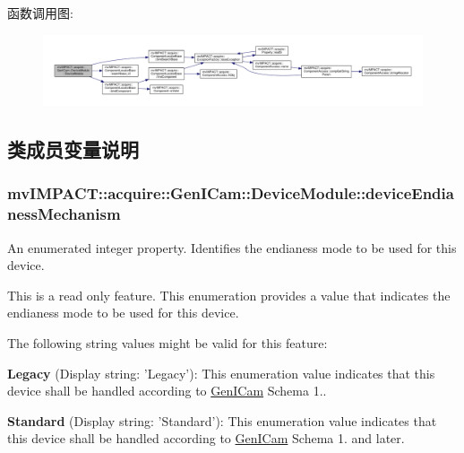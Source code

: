 函数调用图\+:
\nopagebreak
\begin{figure}[H]
\begin{center}
\leavevmode
\includegraphics[width=350pt]{classmv_i_m_p_a_c_t_1_1acquire_1_1_gen_i_cam_1_1_device_module_ada7102c00fd8939e399670e062680c21_cgraph}
\end{center}
\end{figure}




\subsection{类成员变量说明}
\hypertarget{classmv_i_m_p_a_c_t_1_1acquire_1_1_gen_i_cam_1_1_device_module_a161cbbee3d2b92bba2fddc81986ff048}{
\subsubsection[{device\+Endianess\+Mechanism}]{ mv\+I\+M\+P\+A\+C\+T\+::acquire\+::\+Gen\+I\+Cam\+::\+Device\+Module\+::device\+Endianess\+Mechanism}}\label{classmv_i_m_p_a_c_t_1_1acquire_1_1_gen_i_cam_1_1_device_module_a161cbbee3d2b92bba2fddc81986ff048}


An enumerated integer property. Identifies the endianess mode to be used for this device. 

This is a read only feature. This enumeration provides a value that indicates the endianess mode to be used for this device.

The following string values might be valid for this feature\+:
\begin{DoxyItemize}
\item {\bfseries Legacy} (Display string\+: 'Legacy')\+: This enumeration value indicates that this device shall be handled according to \hyperlink{namespacemv_i_m_p_a_c_t_1_1acquire_1_1_gen_i_cam}{Gen\+I\+Cam} Schema 1..
\item {\bfseries Standard} (Display string\+: 'Standard')\+: This enumeration value indicates that this device shall be handled according to \hyperlink{namespacemv_i_m_p_a_c_t_1_1acquire_1_1_gen_i_cam}{Gen\+I\+Cam} Schema 1. and later.
\end{DoxyItemize}

